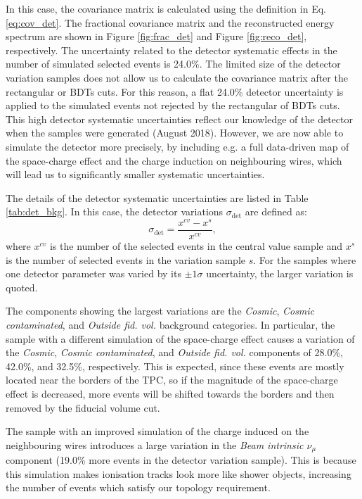 In this case, the covariance matrix is calculated using the definition in Eq. \ref{eq:cov_det}. The fractional covariance matrix and the reconstructed energy spectrum are shown in Figure \ref{fig:frac_det} and Figure \ref{fig:reco_det}, respectively.
The uncertainty related to the detector systematic effects in the number of simulated selected events is 24.0\%. The limited size of the detector variation samples does not allow us to calculate the covariance matrix after the rectangular or BDTs cuts. For this reason, a flat 24.0\% detector uncertainty is applied to the simulated events not rejected by the rectangular of BDTs cuts. This high detector systematic uncertainties reflect our knowledge of the detector when the samples were generated (August 2018). However, we are now able to simulate the detector more precisely, by including e.g. a full data-driven map of the space-charge effect and the charge induction on neighbouring wires, which will lead us to significantly smaller systematic uncertainties. %

The details of the detector systematic uncertainties are listed in Table \ref{tab:det_bkg}. In this case, the detector variations $\sigma_{\mathrm{det}}$ are defined as:
\begin{equation}
    \sigma_{\mathrm{det}} = \frac{x^{cv} - x^s}{x^{cv}},
\end{equation}
where $x^{cv}$ is the number of the selected events in the central value sample and $x^s$ is the number of selected events in the variation sample $s$. For the samples where one detector parameter was varied by its $\pm1\sigma$ uncertainty, the larger variation is quoted.

The components showing the largest variations are the \emph{Cosmic}, \emph{Cosmic contaminated}, and \emph{Outside fid. vol.} background categories. In particular, the sample with a different simulation of the space-charge effect causes a variation of the \emph{Cosmic}, \emph{Cosmic contaminated}, and \emph{Outside fid. vol.} components of 28.0\%, 42.0\%, and 32.5\%, respectively. This is expected, since these events are mostly located near the borders of the TPC, so if the magnitude of the space-charge effect is decreased, more events will be shifted towards the borders and then removed by the fiducial volume cut.

The sample with an improved simulation of the charge induced on the neighbouring wires introduces a large variation in the \emph{Beam intrinsic $\nu_{\mu}$} component (19.0\% more events in the detector variation sample). This is because this simulation makes ionisation tracks look more like shower objects, increasing the number of events which satisfy our topology requirement.

